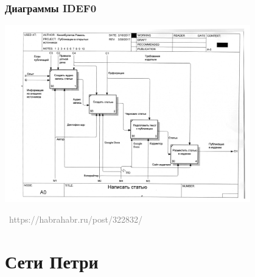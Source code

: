 \documentclass[xetex,mathserif,serif]{beamer}
\newcommand{\attribution}[1] {
	\vspace{-5mm}\begin{flushright}\begin{scriptsize}\textcolor{gray}{\textcopyright\, #1}\end{scriptsize}\end{flushright}
}
\begin{document}
	\begin{frame}
		\frametitle{Диаграммы IDEF0}
		\begin{center}
			\includegraphics[width=0.80\textwidth]{idef0.png}
			\attribution{https://habrahabr.ru/post/322832/}
		\end{center}
	\end{frame}

	\section{Сети Петри}
\end{document}
